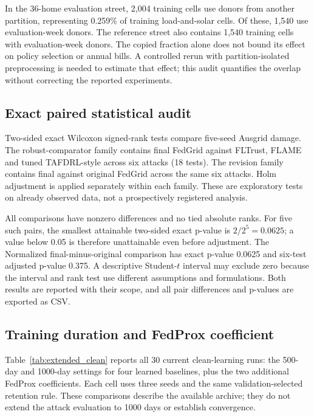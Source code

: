 In the 36-home evaluation street, 2,004 training cells use donors from another partition, representing 0.259\% of training load-and-solar cells. Of these, 1,540 use evaluation-week donors. The reference street also contains 1,540 training cells with evaluation-week donors. The copied fraction alone does not bound its effect on policy selection or annual bills. A controlled rerun with partition-isolated preprocessing is needed to estimate that effect; this audit quantifies the overlap without correcting the reported experiments.


\subsection{Exact paired statistical audit}
Two-sided exact Wilcoxon signed-rank tests compare five-seed Ausgrid damage. The robust-comparator family contains final FedGrid against FLTrust, FLAME and tuned TAFDRL-style across six attacks (18 tests). The revision family contains final against original FedGrid across the same six attacks. Holm adjustment is applied separately within each family. These are exploratory tests on already observed data, not a prospectively registered analysis.

All comparisons have nonzero differences and no tied absolute ranks. For five such pairs, the smallest attainable two-sided exact p-value is $2/2^5=0.0625$; a value below 0.05 is therefore unattainable even before adjustment. The Normalized final-minus-original comparison has exact p-value 0.0625 and six-test adjusted p-value 0.375. A descriptive Student-$t$ interval may exclude zero because the interval and rank test use different assumptions and formulations. Both results are reported with their scope, and all pair differences and p-values are exported as CSV.


\subsection{Training duration and FedProx coefficient}
Table~\ref{tab:extended_clean} reports all 30 current clean-learning runs: the 500-day and 1000-day settings for four learned baselines, plus the two additional FedProx coefficients. Each cell uses three seeds and the same validation-selected retention rule. These comparisons describe the available archive; they do not extend the attack evaluation to 1000 days or establish convergence.


